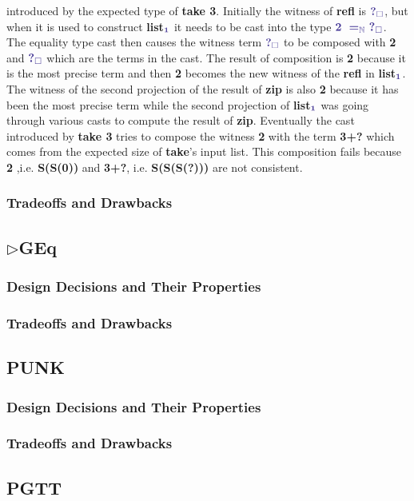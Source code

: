 \documentclass{article}
\theoremstyle{definition}
\newcommand{\Ccode}[1]{{\color{BlueViolet}\textbf{#1}}}
\newcommand{\Ccmath}[1]{{\color{BlueViolet}\boldsymbol{#1}}}
\newcommand{\GGEq}[0]{\(\triangleright\)GEq}
\begin{document}
introduced by the expected type of \Ccode{take 3}. Initially the witness of
\Ccode{refl} is \(\Ccmath{?_{\square}}\), but when it is used to construct
\Ccode{list}\(\Ccmath{_1}\) it needs to be cast into the type
\(\Ccmath{2\ =_\mathbb{N}\ ?_\square}\). The equality type cast then causes the
witness term \(\Ccmath{?_{\square}}\) to be composed with \Ccode{2} and
\(\Ccmath{?_\square}\) which are the terms in the cast. The result of
composition is \Ccode{2} because it is the most precise term and then \Ccode{2}
becomes the new witness of the \Ccode{refl} in \Ccode{list}\(\Ccmath{_1}\). The
witness of the second projection of the result of \Ccode{zip} is also \Ccode{2}
because it has been the most precise term while the second projection of
\Ccode{list}\(\Ccmath{_1}\) was going through various casts to compute the
result of \Ccode{zip}. Eventually the cast introduced by \Ccode{take 3} tries to
compose the witness \Ccode{2} with the term \Ccode{3+?} which comes from the
expected size of \Ccode{take}'s input list. This composition fails because
\Ccode{2} ,i.e. \Ccode{S(S(0))} and \Ccode{3+?}, i.e. \Ccode{S(S(S(?)))} are not
consistent.

\subsubsection{Tradeoffs and Drawbacks}
\subsection{\GGEq{}}
\subsubsection{Design Decisions and Their Properties}
\subsubsection{Tradeoffs and Drawbacks}
\subsection{PUNK}
\subsubsection{Design Decisions and Their Properties}
\subsubsection{Tradeoffs and Drawbacks}
\subsection{PGTT}
\end{document}
